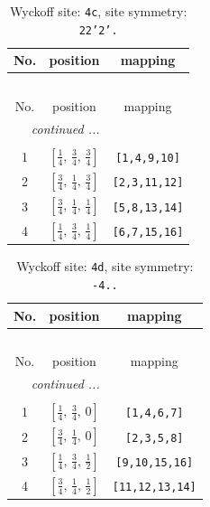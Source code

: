 \documentclass[fleqn,8pt]{jsarticle}
\begin{document}
\renewcommand{\arraystretch}{1.2}
\begin{longtable}{ccc}
\caption{Wyckoff site: {\tt 4c}, site symmetry: {\tt 22'2'.}}
 \\
 \hline \hline
No. & position & mapping \\ \hline \endfirsthead

\multicolumn{2}{l}{\tablename\ \thetable{}} \\
 \hline \hline
No. & position & mapping \\ \hline \endhead

 \hline \hline
\multicolumn{2}{r}{\footnotesize\it continued ...} \\ \endfoot

 \hline \hline
\multicolumn{2}{r}{} \\ \endlastfoot

1 & $\left[ \frac{1}{4},\, \frac{3}{4},\, \frac{3}{4} \right]$ & {\tt [1,4,9,10]} \\ \hline
2 & $\left[ \frac{3}{4},\, \frac{1}{4},\, \frac{3}{4} \right]$ & {\tt [2,3,11,12]} \\ \hline
3 & $\left[ \frac{3}{4},\, \frac{1}{4},\, \frac{1}{4} \right]$ & {\tt [5,8,13,14]} \\ \hline
4 & $\left[ \frac{1}{4},\, \frac{3}{4},\, \frac{1}{4} \right]$ & {\tt [6,7,15,16]} \\
\end{longtable}
\renewcommand{\arraystretch}{1.2}
\begin{longtable}{ccc}
\caption{Wyckoff site: {\tt 4d}, site symmetry: {\tt -4..}}
 \\
 \hline \hline
No. & position & mapping \\ \hline \endfirsthead

\multicolumn{2}{l}{\tablename\ \thetable{}} \\
 \hline \hline
No. & position & mapping \\ \hline \endhead

 \hline \hline
\multicolumn{2}{r}{\footnotesize\it continued ...} \\ \endfoot

 \hline \hline
\multicolumn{2}{r}{} \\ \endlastfoot

1 & $\left[ \frac{1}{4},\, \frac{3}{4},\, 0 \right]$ & {\tt [1,4,6,7]} \\ \hline
2 & $\left[ \frac{3}{4},\, \frac{1}{4},\, 0 \right]$ & {\tt [2,3,5,8]} \\ \hline
3 & $\left[ \frac{1}{4},\, \frac{3}{4},\, \frac{1}{2} \right]$ & {\tt [9,10,15,16]} \\ \hline
4 & $\left[ \frac{3}{4},\, \frac{1}{4},\, \frac{1}{2} \right]$ & {\tt [11,12,13,14]} \\
\end{longtable}
\end{document}
